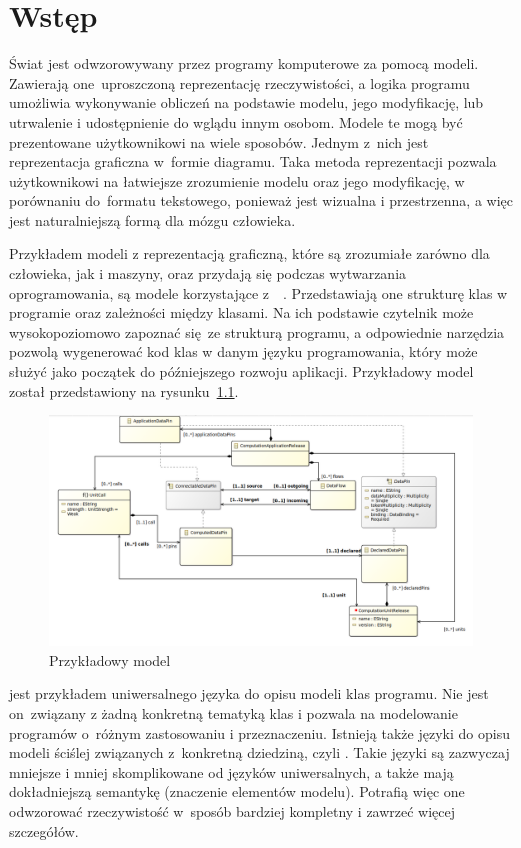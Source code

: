 \chapter{Wstęp}

Świat jest odwzorowywany przez programy komputerowe za pomocą modeli.
Zawierają one~uproszczoną reprezentację rzeczywistości, a logika programu
umożliwia wykonywanie obliczeń na podstawie modelu, jego modyfikację, lub
utrwalenie i udostępnienie do wglądu innym osobom.
Modele te mogą być prezentowane użytkownikowi na wiele sposobów. Jednym z~nich
jest reprezentacja graficzna w~formie diagramu. Taka metoda reprezentacji
pozwala użytkownikowi na łatwiejsze zrozumienie modelu
oraz jego modyfikację, w porównaniu do~formatu tekstowego, ponieważ jest
wizualna i przestrzenna, a więc jest naturalniejszą formą dla mózgu człowieka.

Przykładem modeli z reprezentacją graficzną, które są zrozumiałe zarówno dla
człowieka, jak i maszyny, oraz
przydają się podczas wytwarzania oprogramowania, są modele korzystające
z~~\cite{wikipedia-uml}. Przedstawiają
one strukturę klas w programie oraz zależności między klasami. Na ich podstawie
czytelnik może wysokopoziomowo zapoznać się~ze strukturą programu, a
odpowiednie narzędzia pozwolą wygenerować kod klas w danym języku
programowania, który może służyć jako początek do późniejszego rozwoju
aplikacji. Przykładowy model  został przedstawiony na
rysunku~\ref{rys:przykladowy-model-uml}.

\begin{figure}[!ht]
	\centering
	\includegraphics[width=0.9\linewidth]{./images/example-uml-model.png}
	\caption{Przykładowy model
		}\label{rys:przykladowy-model-uml}
\end{figure}

 jest przykładem uniwersalnego języka do opisu modeli klas
programu.
Nie jest on~związany z żadną konkretną tematyką klas i pozwala na modelowanie
programów o~różnym zastosowaniu i przeznaczeniu. Istnieją także języki do opisu
modeli ściślej związanych z~konkretną dziedziną, czyli . Takie
języki
są zazwyczaj mniejsze i mniej skomplikowane od języków uniwersalnych, a także
mają dokładniejszą semantykę (znaczenie elementów modelu). Potrafią więc one
odwzorować rzeczywistość w~sposób bardziej kompletny i zawrzeć więcej
szczegółów.

